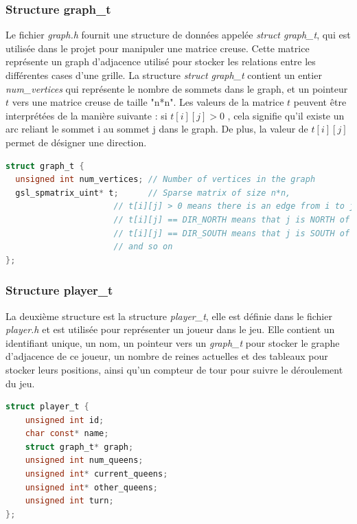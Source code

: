 \documentclass[11pt]{article}
\begin{document}
        \subsubsection{Structure \textbf{graph\_t}}
Le fichier \textit{graph.h} fournit une structure de données appelée \textit{struct graph\_t}, qui est utilisée dans le projet pour manipuler une matrice creuse. Cette matrice représente un graph d'adjacence utilisé pour stocker les relations entre les différentes cases d'une grille. La structure \textit{struct graph\_t} contient un entier \textit{num\_vertices} qui représente le nombre de sommets dans le graph, et un pointeur $t$ vers une matrice creuse de taille "n*n". Les valeurs de la matrice $t$ peuvent être interprétées de la manière suivante : si $t[i][j] > 0$ , cela signifie qu'il existe un arc reliant le sommet i au sommet j dans le graph. De plus, la valeur de $t[i][j]$ permet de désigner une direction.

\begin{lstlisting}[language=C]
struct graph_t {
  unsigned int num_vertices; // Number of vertices in the graph
  gsl_spmatrix_uint* t;      // Sparse matrix of size n*n,
                      // t[i][j] > 0 means there is an edge from i to j
                      // t[i][j] == DIR_NORTH means that j is NORTH of i
                      // t[i][j] == DIR_SOUTH means that j is SOUTH of i
                      // and so on
};
\end{lstlisting}


        
        \subsubsection{Structure \textbf{player\_t}}

        La deuxième structure est la structure \textit{player\_t}, elle est définie dans le fichier \textit{player.h} et est utilisée pour représenter un joueur dans le jeu. Elle contient un identifiant unique, un nom, un pointeur vers un \textit{graph\_t} pour stocker le graphe d'adjacence de ce joueur, un nombre de reines actuelles et des tableaux pour stocker leurs positions, ainsi qu'un compteur de tour pour suivre le déroulement du jeu.
        
\begin{lstlisting}[language=C]
struct player_t {
    unsigned int id;
    char const* name;
    struct graph_t* graph;
    unsigned int num_queens;
    unsigned int* current_queens;
    unsigned int* other_queens;
    unsigned int turn;
};

\end{lstlisting}
\end{document}
